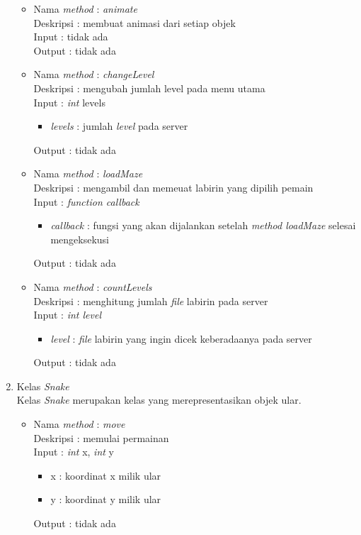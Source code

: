 \begin{enumerate}
\begin{itemize}
\begin{itemize}
				  	\end{itemize}
			\item Nama \textit{method} : \textit{animate}\\
				  Deskripsi : membuat animasi dari setiap objek\\
				  Input : tidak ada\\
				  Output : tidak ada
			\item Nama \textit{method} : \textit{changeLevel}\\
				  Deskripsi : mengubah jumlah level pada menu utama \\
				  Input : \textit{int} levels
				  	\begin{itemize}
				  		\item \textit{levels} : jumlah \textit{level} pada server
				  	\end{itemize}
				  Output : tidak ada
			\item Nama \textit{method} : \textit{loadMaze}\\
				  Deskripsi : mengambil dan memeuat labirin yang dipilih pemain\\
				  Input : \textit{function callback}
				  	\begin{itemize}
				  		\item \textit{callback} : fungsi yang akan dijalankan setelah \textit{method loadMaze} selesai mengeksekusi
				  	\end{itemize}
				  Output : tidak ada
			\item Nama \textit{method} : \textit{countLevels}\\
				  Deskripsi : menghitung jumlah \textit{file} labirin pada server\\
				  Input : \textit{int level}
				  	\begin{itemize}
				  		\item \textit{level} : \textit{file} labirin yang ingin dicek keberadaanya pada server
				  	\end{itemize}
				  Output : tidak ada\\
		\end{itemize}
		
	\item Kelas \textit{Snake}\\
	Kelas \textit{Snake} merupakan kelas yang merepresentasikan objek ular.
		
		\begin{itemize}
			\item Nama \textit{method} : \textit{move}\\
				  Deskripsi : memulai permainan\\
				  Input : \textit{int} x, \textit{int} y
				  	\begin{itemize}
				  		\item x : koordinat x milik ular
				  		\item y : koordinat y milik ular
				  	\end{itemize}
				  Output : tidak ada\\
				  

\end{itemize}
\end{enumerate}
